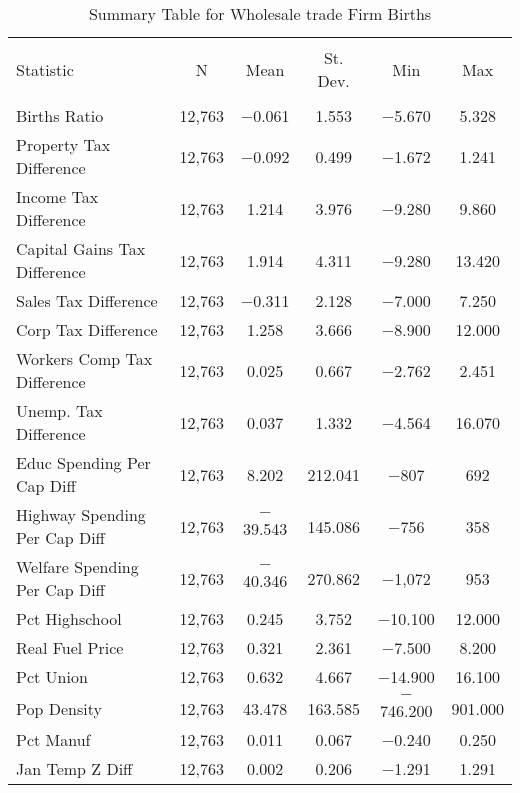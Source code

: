 
\begin{table}[!htbp] \centering 
  \caption{Summary Table for  Wholesale trade Firm Births} 
  \label{42summary} 
\begin{tabular}{@{\extracolsep{5pt}}lccccc} 
\\[-1.8ex]\hline 
\hline \\[-1.8ex] 
Statistic & \multicolumn{1}{c}{N} & \multicolumn{1}{c}{Mean} & \multicolumn{1}{c}{St. Dev.} & \multicolumn{1}{c}{Min} & \multicolumn{1}{c}{Max} \\ 
\hline \\[-1.8ex] 
Births Ratio & 12,763 & $-$0.061 & 1.553 & $-$5.670 & 5.328 \\ 
Property Tax Difference & 12,763 & $-$0.092 & 0.499 & $-$1.672 & 1.241 \\ 
Income Tax Difference & 12,763 & 1.214 & 3.976 & $-$9.280 & 9.860 \\ 
Capital Gains Tax Difference & 12,763 & 1.914 & 4.311 & $-$9.280 & 13.420 \\ 
Sales Tax Difference & 12,763 & $-$0.311 & 2.128 & $-$7.000 & 7.250 \\ 
Corp Tax Difference & 12,763 & 1.258 & 3.666 & $-$8.900 & 12.000 \\ 
Workers Comp Tax Difference & 12,763 & 0.025 & 0.667 & $-$2.762 & 2.451 \\ 
Unemp. Tax Difference & 12,763 & 0.037 & 1.332 & $-$4.564 & 16.070 \\ 
Educ Spending Per Cap Diff & 12,763 & 8.202 & 212.041 & $-$807 & 692 \\ 
Highway Spending Per Cap Diff & 12,763 & $-$39.543 & 145.086 & $-$756 & 358 \\ 
Welfare Spending Per Cap Diff & 12,763 & $-$40.346 & 270.862 & $-$1,072 & 953 \\ 
Pct Highschool & 12,763 & 0.245 & 3.752 & $-$10.100 & 12.000 \\ 
Real Fuel Price & 12,763 & 0.321 & 2.361 & $-$7.500 & 8.200 \\ 
Pct Union & 12,763 & 0.632 & 4.667 & $-$14.900 & 16.100 \\ 
Pop Density & 12,763 & 43.478 & 163.585 & $-$746.200 & 901.000 \\ 
Pct Manuf & 12,763 & 0.011 & 0.067 & $-$0.240 & 0.250 \\ 
Jan Temp Z Diff & 12,763 & 0.002 & 0.206 & $-$1.291 & 1.291 \\ 

\end{tabular}
\end{table}
